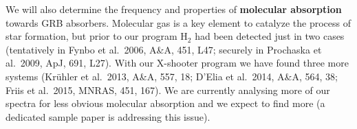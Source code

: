 


\smallskip

We will also determine the frequency and properties of {\bf molecular
	absorption} towards GRB absorbers. Molecular gas is a key element to catalyze
the process of star formation, but prior to our program H$_2$ had been detected
just in two cases (tentatively in Fynbo et al.\ 2006, A\&A, 451, L47; securely
in Prochaska et al.\ 2009, ApJ, 691, L27). With our X-shooter program we have
found three more systems (Kr\"uhler et al.\ 2013, A\&A, 557, 18; D'Elia et al.\
2014, A\&A, 564, 38; Friis et al.\, 2015, MNRAS, 451, 167). 
We are currently analysing more of our spectra for less obvious molecular
absorption and we expect to find more (a dedicated sample paper is 
addressing this issue).

